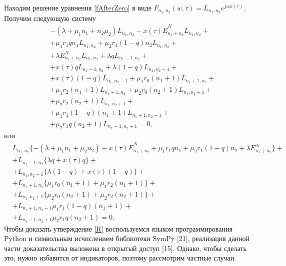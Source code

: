 Находим решение уравнения \eqref{fAfterZero} в виде $F_{n_{1}, n_{2}}(w,\tau)=L_{n_{1}, n_{2}}e^{jwx(\tau)}$. Получим следующую систему\\
\begin{equation*}
	\begin{split}
		&-(\lambda+\mu_{1}n_{1}+n_{2}\mu_{2})L_{n_{1}, n_{2}} 
		- x(\tau)\overline{E}_{n_{1}+n_{2}}^N L_{n_{1}, n_{2}}+\\
		&+ \mu_{1}r_{1}qn_{1}L_{n_{1}, n_{2}}+ \mu_{2}r_{1}(1-q)n_{2}L_{n_{1}, n_{2}}+\\
		&+ \lambda  E_{n_{1}+n_{2}}^N L_{n_{1}, n_{2}}+\lambda qL_{n_{1}-1, n_{2}}+\\
		&+ x(\tau) q  L_{n_{1}-1, n_{2}}+\lambda (1-q)L_{n_{1}, n_{2}-1} +\\
		&+ x(\tau) (1-q) L_{n_{1}, n_{2}-1}+ \mu_{1} r_{0} (n_{1}+1)L_{n_{1} +1 , n_{2}} +\\
		&+ \mu_{1} r_{2} (n_{1}+1) L_{n_{1} + 1, n_{2}}+ \mu_{2} r_{0} (n_{2}+1)L_{n_{1}, n_{2} + 1 }+\\
		& + \mu_{2} r_{2} (n_{2}+1) L_{n_{1}, n_{2} + 1}+\\
		&+\mu_{1} r_{1}(1-q)(n_{1}+1) L_{n_{1} +1 , n_{2}-1}+\\
		&+\mu_{2} r_{1}q (n_{2}+1)L_{n_{1} -1 , n_{2}+1}=0,
	\end{split}
\end{equation*}
или
\begin{equation}\label{sistForR}
	\begin{split}
		&L_{n_{1}, n_{2}}\{-(\lambda+\mu_{1}n_{1}+\mu_{2}n_{2}) - x(\tau)\overline{E}_{n_{1}+n_{2}}^N+ \mu_{1}r_{1}qn_{1}+ \mu_{2}r_{1}(1-q)n_{2}+ \lambda  E_{n_{1}+n_{2}}^N\}+\\
		&+L_{n_{1}-1, n_{2}}\{\lambda q+ x(\tau) q  \}+\\
		&+L_{n_{1}, n_{2}-1}\{\lambda (1-q) + x(\tau) (1-q) \}+\\
		&+L_{n_{1} +1 , n_{2}}\{ \mu_{1} r_{0}(n_{1}+1) + \mu_{1} r_{2} (n_{1}+1)\}+\\
		&+L_{n_{1}, n_{2} + 1 }\{ \mu_{2} r_{0} (n_{2}+1) + \mu_{2} r_{2} (n_{2}+1) \}+\\
		&+ L_{n_{1} +1 , n_{2}-1}\mu_{1} r_{1}(1-q)(n_{1}+1)+\\
		&+L_{n_{1} -1 , n_{2}+1}\mu_{2} r_{1}q(n_{2}+1) =0.
	\end{split}
\end{equation}
Чтобы доказать утверждение \eqref{R} воспользуемся языком программирования Python и символьным исчислением библиотеки SymPy [21], реализация данной части доказательства выложена в открытый доступ [15]. Однако, чтобы сделать это, нужно избавится от индикаторов, поэтому рассмотрим частные случаи.\\

